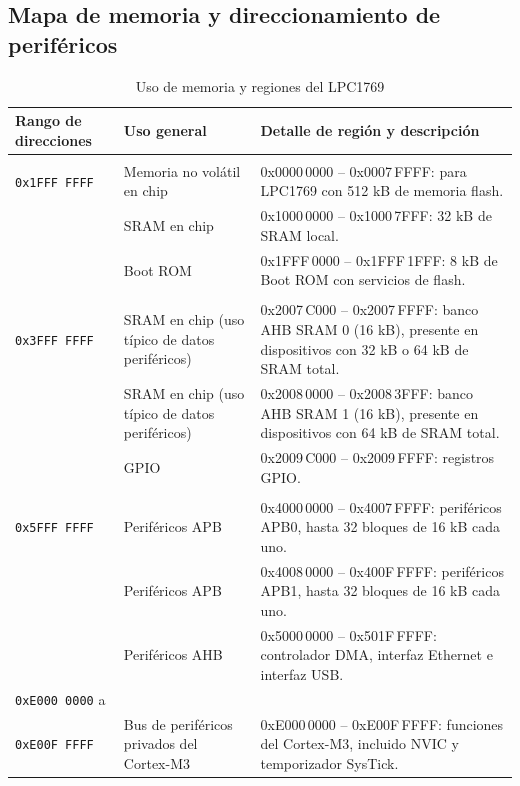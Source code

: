 ﻿\documentclass[11pt]{article}
\begin{document}
\subsection{Mapa de memoria y direccionamiento de periféricos}
\begin{table}[H]
  \centering
  \small
  \renewcommand{\arraystretch}{1.2}
  \setlength{\tabcolsep}{6pt}
  \caption{Uso de memoria y regiones del LPC1769}
  \begin{tabularx}{\textwidth}{|>{\raggedright\arraybackslash}p{}|>{\raggedright\arraybackslash}p{}|>{\raggedright\arraybackslash}X|}
    \hline
    \textbf{Rango de direcciones} & \textbf{Uso general} & \textbf{Detalle de región y descripción} \\
    \hline
    \multirow{3}{=}{\texttt{0x0000\,0000} a \\ \texttt{0x1FFF\,FFFF}}
      & Memoria no volátil en chip & 0x0000\,0000 -- 0x0007\,FFFF: para LPC1769 con 512 kB de memoria flash. \\
    \cline{2-3}
      & SRAM en chip & 0x1000\,0000 -- 0x1000\,7FFF: 32 kB de SRAM local. \\
    \cline{2-3}
      & Boot ROM & 0x1FFF\,0000 -- 0x1FFF\,1FFF: 8 kB de Boot ROM con servicios de flash. \\
    \hline
    \multirow{3}{=}{\texttt{0x2000\,0000} a \\ \texttt{0x3FFF\,FFFF}}
      & SRAM en chip (uso típico de datos periféricos) & 0x2007\,C000 -- 0x2007\,FFFF: banco AHB SRAM 0 (16 kB), presente en dispositivos con 32 kB o 64 kB de SRAM total. \\
    \cline{2-3}
      & SRAM en chip (uso típico de datos periféricos) & 0x2008\,0000 -- 0x2008\,3FFF: banco AHB SRAM 1 (16 kB), presente en dispositivos con 64 kB de SRAM total. \\
    \cline{2-3}
      & GPIO & 0x2009\,C000 -- 0x2009\,FFFF: registros GPIO. \\
    \hline
    \multirow{3}{=}{\texttt{0x4000\,0000} a \\ \texttt{0x5FFF\,FFFF}}
      & Periféricos APB & 0x4000\,0000 -- 0x4007\,FFFF: periféricos APB0, hasta 32 bloques de 16 kB cada uno. \\
    \cline{2-3}
      & Periféricos APB & 0x4008\,0000 -- 0x400F\,FFFF: periféricos APB1, hasta 32 bloques de 16 kB cada uno. \\
    \cline{2-3}
      & Periféricos AHB & 0x5000\,0000 -- 0x501F\,FFFF: controlador DMA, interfaz Ethernet e interfaz USB. \\
    \hline
    \texttt{0xE000\,0000} a \\ \texttt{0xE00F\,FFFF}
      & Bus de periféricos privados del Cortex-M3 & 0xE000\,0000 -- 0xE00F\,FFFF: funciones del Cortex-M3, incluido NVIC y temporizador SysTick. \\
    \hline
  \end{tabularx}
\end{table}
\end{document}
